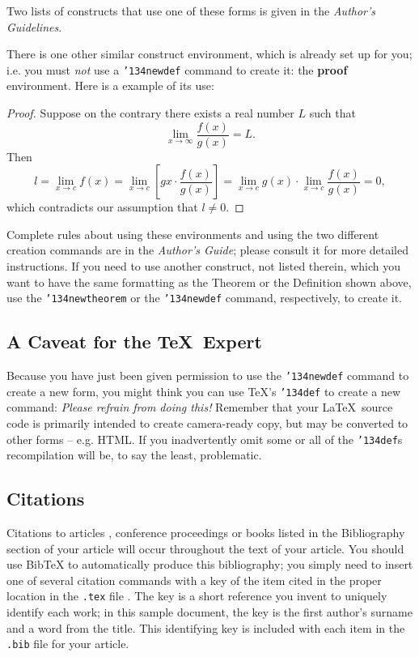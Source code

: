 \documentclass{nime-alternate} %
\begin{document}
Two lists of constructs that use one of these
forms is given in the
\textit{Author's  Guidelines}.
 
There is one other similar construct environment, which is
already set up
for you; i.e. you must \textit{not} use
a \texttt{{\char'134}newdef} command to
create it: the \textbf{proof} environment.  Here
is a example of its use:
\begin{proof}
Suppose on the contrary there exists a real number $L$ such that
\begin{displaymath}
\lim_{x\rightarrow\infty} \frac{f(x)}{g(x)} = L.
\end{displaymath}
Then
\begin{displaymath}
l=\lim_{x\rightarrow c} f(x)
= \lim_{x\rightarrow c}
\left[ g{x} \cdot \frac{f(x)}{g(x)} \right ]
= \lim_{x\rightarrow c} g(x) \cdot \lim_{x\rightarrow c}
\frac{f(x)}{g(x)} = 0,
\end{displaymath}
which contradicts our assumption that $l\neq 0$.
\end{proof}

Complete rules about using these environments and using the
two different creation commands are in the
\textit{Author's Guide}; please consult it for more
detailed instructions.  If you need to use another construct,
not listed therein, which you want to have the same
formatting as the Theorem
or the Definition \cite{salas:calculus} shown above,
use the \texttt{{\char'134}newtheorem} or the
\texttt{{\char'134}newdef} command,
respectively, to create it.

\subsection{A {\secit Caveat} for the \TeX\ Expert}
Because you have just been given permission to
use the \texttt{{\char'134}newdef} command to create a
new form, you might think you can
use \TeX's \texttt{{\char'134}def} to create a
new command: \textit{Please refrain from doing this!}
Remember that your \LaTeX\ source code is primarily intended
to create camera-ready copy, but may be converted
to other forms -- e.g. HTML. If you inadvertently omit
some or all of the \texttt{{\char'134}def}s recompilation will
be, to say the least, problematic.



\subsection{Citations}
Citations to articles \cite{bowman:reasoning,
clark:pct, braams:babel, herlihy:methodology},
conference proceedings \cite{clark:pct} or
books \cite{salas:calculus, Lamport:LaTeX} listed
in the Bibliography section of your
article will occur throughout the text of your article.
You should use BibTeX to automatically produce this bibliography;
you simply need to insert one of several citation commands with
a key of the item cited in the proper location in
the \texttt{.tex} file \cite{Lamport:LaTeX}.
The key is a short reference you invent to uniquely
identify each work; in this sample document, the key is
the first author's surname and a
word from the title.  This identifying key is included
with each item in the \texttt{.bib} file for your article.
\end{document}
